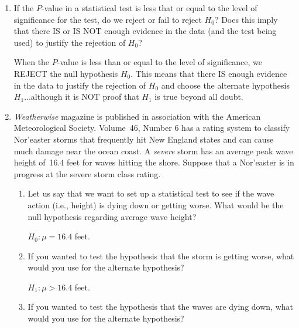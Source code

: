 \documentclass{article}
\newcommand{\answer}[1]{\color{white}#1}
\begin{document}
\pagestyle{myheadings}

\begin{center}
\textbf{}
\end{center}

\begin{enumerate}



\item If the $P$-value in a statistical test is less that or equal to the level of significance for the test, do we reject or fail to reject $H_0$? Does this imply that there IS or IS NOT enough evidence in the data (and the test being used) to justify the rejection of $H_0$? 

	{\answer When the $P$-value is less than or equal to the level of significance, we REJECT the null hypothesis $H_0$. 
	This means that there IS enough evidence in the data to justify the rejection of $H_0$ and choose the alternate hypothesis $H_1$...although it is NOT proof that $H_1$ is true beyond all doubt.}
	 
\vfill


\item {\it Weatherwise} magazine is published in association with the American Meteorological Society. Volume~46, Number 6 has a rating system to classify Nor'easter storms that frequently hit New England states and can cause much damage near the ocean coast. A {\it severe} storm has an average peak wave height of~16.4 feet for waves hitting the shore. Suppose that a Nor'easter is in progress at the severe storm class rating.
	\begin{enumerate}
	\item Let us say that we want to set up a statistical test to see if the wave action (i.e., height) is dying down or getting worse. What would be the null hypothesis regarding average wave height? 
	
	{\answer $H_0 : \mu = 16.4$ feet.} 
	 
	
	\item If you wanted to test the hypothesis that the storm is getting worse, what would you use for the alternate hypothesis? 
	
	{\answer $H_1: \mu > 16.4$ feet.}
	 
	
	\item If you wanted to test the hypothesis that the waves are dying down, what would you use for the alternate hypothesis? 
	

\end{enumerate}
\end{enumerate}
\end{document}
